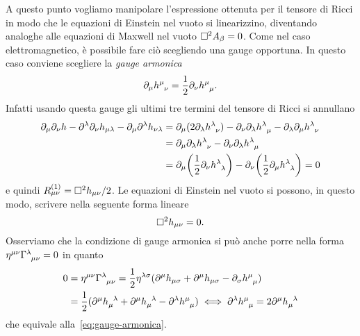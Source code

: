A questo punto vogliamo manipolare l'espressione ottenuta per il tensore di
Ricci in modo che le equazioni di Einstein nel vuoto si linearizzino, diventando
analoghe alle equazioni di Maxwell nel vuoto $\Box^{2} A_{\beta} = 0$.  Come nel
caso elettromagnetico, è possibile fare ciò scegliendo una gauge opportuna.  In
questo caso conviene scegliere la \emph{gauge armonica}
\begin{equation}
  \label{eq:gauge-armonica}
  \partial_{\mu} \tensor{h}{^{\mu}_{\nu}} =
  \frac{1}{2}\partial_{\nu}\tensor{h}{^{\mu}_{\mu}}.
\end{equation}
Infatti usando questa gauge gli ultimi tre termini del tensore di Ricci si
annullano
\begin{equation}
  \begin{split}
    \partial_{\mu}\partial_{\nu} h - \partial^{\lambda}\partial_{\nu}
    h_{\mu\lambda} - \partial_{\mu}\partial^{\lambda} h_{\nu\lambda}
    &= \partial_{\mu}(2 \partial_{\lambda}\tensor{h}{^{\lambda}_{\nu}})
    - \partial_{\nu}\partial_{\lambda}\tensor{h}{^{\lambda}_{\mu}}
    - \partial_{\lambda}\partial_{\mu} \tensor{h}{^{\lambda}_{\nu}} \\
    &= \partial_{\mu}\partial_{\lambda} \tensor{h}{^{\lambda}_{\nu}}
    - \partial_{\nu}\partial_{\lambda} \tensor{h}{^{\lambda}_{\mu}} \\
    &= \partial_{\mu}\bigg(\frac{1}{2}\partial_{\nu}
    \tensor{h}{^{\lambda}_{\lambda}}\bigg)
    - \partial_{\nu}\bigg(\frac{1}{2}\partial_{\mu}
    \tensor{h}{^{\lambda}_{\lambda}}\bigg) = 0
  \end{split}
\end{equation}
e quindi $R_{\mu\nu}^{(1)} = \Box^{2} h_{\mu\nu}/2$.  Le equazioni di Einstein
nel vuoto si possono, in questo modo, scrivere nella seguente forma lineare
\begin{equation}
  \label{eq:einstein-lineare}
  \Box^{2} h_{\mu\nu} = 0.
\end{equation}
Osserviamo che la condizione di gauge armonica si può anche porre nella forma
$\eta^{\mu\nu}\tensor{\Gamma}{^{\lambda}_{\mu\nu}} = 0$ in quanto
\begin{equation}
  \begin{split}
    0 &=\eta^{\mu\nu} \tensor{\Gamma}{^{\lambda}_{\mu\nu}} = \frac{1}{2}
    \eta^{\lambda\sigma} (\partial^{\mu}h_{\mu\sigma} + \partial^{\mu}
    h_{\mu\sigma} - \partial_{\sigma}\tensor{h}{^{\mu}_{\mu}}) \\
    &= \frac{1}{2} (\partial^{\mu} \tensor{h}{_{\mu}^{\lambda}} + \partial^{\mu}
    \tensor{h}{_{\mu}^{\lambda}} - \partial^{\lambda} \tensor{h}{^{\mu}_{\mu}})
    \iff \partial^{\lambda} \tensor{h}{^{\mu}_{\mu}} = 2 \partial^{\mu}
    \tensor{h}{_{\mu}^{\lambda}}
  \end{split}
\end{equation}
che equivale alla~\eqref{eq:gauge-armonica}.

